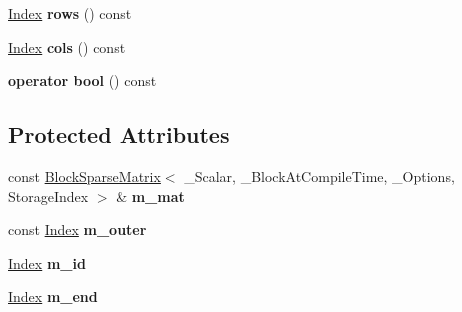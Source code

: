 \begin{DoxyCompactItemize}
\hyperlink{group___core___module_a554f30542cc2316add4b1ea0a492ff02}{Index} {\bfseries rows} () const
\item 
\mbox{\label{class_eigen_1_1_block_sparse_matrix_1_1_block_inner_iterator_aa74e42f8de5ec992ff5bf3db592b490a}} 
\hyperlink{group___core___module_a554f30542cc2316add4b1ea0a492ff02}{Index} {\bfseries cols} () const
\item 
\mbox{\label{class_eigen_1_1_block_sparse_matrix_1_1_block_inner_iterator_a8b9e27d96dc73264af39633e5739618d}} 
{\bfseries operator bool} () const
\end{DoxyCompactItemize}
\subsection*{Protected Attributes}
\begin{DoxyCompactItemize}
\item 
\mbox{\label{class_eigen_1_1_block_sparse_matrix_1_1_block_inner_iterator_a303c68eba36e3eec303ab0b51dfceb91}} 
const \hyperlink{group___sparse_core___module_class_eigen_1_1_block_sparse_matrix}{Block\+Sparse\+Matrix}$<$ \+\_\+\+Scalar, \+\_\+\+Block\+At\+Compile\+Time, \+\_\+\+Options, Storage\+Index $>$ \& {\bfseries m\+\_\+mat}
\item 
\mbox{\label{class_eigen_1_1_block_sparse_matrix_1_1_block_inner_iterator_add7ec83d2a41a064321cb3b27cb5477f}} 
const \hyperlink{group___core___module_a554f30542cc2316add4b1ea0a492ff02}{Index} {\bfseries m\+\_\+outer}
\item 
\mbox{\label{class_eigen_1_1_block_sparse_matrix_1_1_block_inner_iterator_a8139d79ebaca7c95368d472f7596d4bc}} 
\hyperlink{group___core___module_a554f30542cc2316add4b1ea0a492ff02}{Index} {\bfseries m\+\_\+id}
\item 
\mbox{\label{class_eigen_1_1_block_sparse_matrix_1_1_block_inner_iterator_abb930b7e349251585823c8c32cab3157}} 
\hyperlink{group___core___module_a554f30542cc2316add4b1ea0a492ff02}{Index} {\bfseries m\+\_\+end}
\end{DoxyCompactItemize}


